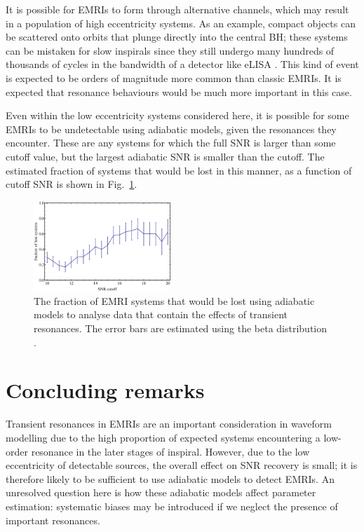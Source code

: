 \documentclass[aps,prd,amsfonts,amssymb,amsmath,nofootinbib,reprint,showpacs,superscriptaddress,twocolumn]{revtex4}
\newcommand{\figref}[1]{Fig.\ \ref{fig:#1}}
\begin{document}
It is possible for EMRIs to form through alternative channels, which may result in a population of high eccentricity systems. As an example, compact objects can be scattered onto orbits that plunge directly into the central BH; these systems can be mistaken for slow inspirals since they still undergo many hundreds of thousands of cycles in the bandwidth of a detector like eLISA \cite{Amaro-Seoane2013}. This kind of event is expected to be orders of magnitude more common than classic EMRIs. It is expected that resonance behaviours would be much more important in this case.

Even within the low eccentricity systems considered here, it is possible for some EMRIs to be undetectable using adiabatic models, given the resonances they encounter. These are any systems for which the full SNR is larger than some cutoff value, but the largest adiabatic SNR is smaller than the cutoff. The estimated fraction of systems that would be lost in this manner, as a function of cutoff SNR is shown in \figref{SNRcutoff}.

\begin{figure}[htbp]
\centering
\includegraphics[width=0.46\textwidth]{Fig_SNRcutoff}
\caption{\label{fig:SNRcutoff}The fraction of EMRI systems that would be lost using adiabatic models to analyse data that contain the effects of transient resonances. The error bars are estimated using the beta distribution \cite{Cameron2011}.}
\end{figure}

\section{Concluding remarks}
\label{sec:conclusion}

Transient resonances in EMRIs are an important consideration in waveform modelling due to the high proportion of expected systems encountering a low-order resonance in the later stages of inspiral. However, due to the low eccentricity of detectable sources, the overall effect on SNR recovery is small; it is therefore likely to be sufficient to use adiabatic models to detect EMRIs. An unresolved question here is how these adiabatic models affect parameter estimation: systematic biases may be introduced if we neglect the presence of important resonances.
\end{document}
